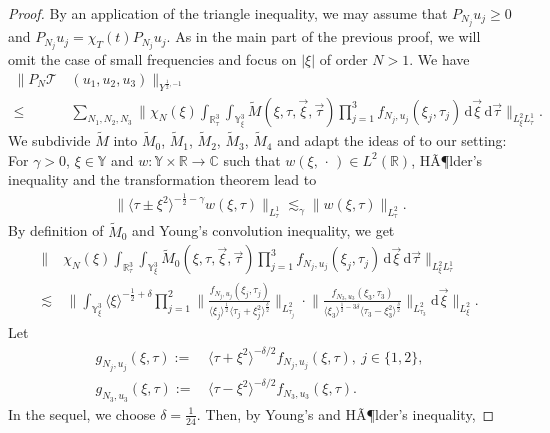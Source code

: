 \documentclass[reqno]{amsart}
\theoremstyle{Definitionl}
\theoremstyle{Definitionk}
\theoremstyle{definition}
\theoremstyle{Satzk}
\theoremstyle{Satzl}
\theoremstyle{Bemerkung}
\begin{document}
\begin{proof}By an application of the triangle inequality, we may assume that $P_{N_j}u_j\ge0$ and $P_{N_j}u_j=\chi_T(t)P_{N_j}u_j$. As in the main part of the previous proof, we will omit the case of small frequencies and focus on $|\xi|$ of order $N>1$. We have
\begin{align}
\|P_{N}\mathcal T&\,(u_1,u_2,u_3)\|_{Y^{\frac12,-1}}\nonumber\\
\le&\, \sum_{N_1,N_2,N_3}\Big\|\chi_N(\xi)\int_{\mathbb R^3_\tau}\int_{\mathbb Y^3_\xi}\tilde M(\xi,\tau,\vec\xi,\vec\tau)\prod_{j=1}^3f_{N_j,u_j}(\xi_j,\tau_j)\,\mathrm d\vec\xi\,\mathrm d\vec\tau\Big\|_{L^2_\xi L^1_\tau}.\label{L2L1}
\end{align}
We subdivide $\tilde M$ into $\tilde M_0$, $\tilde M_1$, $\tilde M_2$, $\tilde M_3$, $\tilde M_4$ and adapt the ideas of \cite[Thm. 4.2]{Herr} to our setting: For $\gamma>0$, $\xi\in\mathbb Y$ and $w\colon\mathbb Y\times\mathbb R\to\mathbb C$ such that $w(\xi,\,\cdot\,)\in L^2(\mathbb R)$, HÃ¶lder's inequality and the transformation theorem lead to
\begin{align}
\big\|\langle\tau\pm\xi^2\rangle^{-\frac12-\gamma}w(\xi,\tau)\big\|_{L^1_\tau}\lesssim_{\gamma}\big\|w(\xi,\tau)\big\|_{L^2_{\tau}}\label{CSU}.
\end{align}
By definition of $\tilde M_0$ and Young's convolution inequality, we get
\begin{align}
\bigg\|&\chi_N(\xi)\int_{\mathbb R^3_\tau}\int_{\mathbb Y^3_\xi}\tilde M_0(\xi,\tau,\vec\xi,\vec\tau)\prod_{j=1}^3f_{N_j,u_j}(\xi_j,\tau_j)\,\mathrm d\vec\xi\,\mathrm d\vec\tau\bigg\|_{L^2_\xi L^1_\tau}\nonumber\\
\lesssim&\, \bigg\|\int_{\mathbb Y^3_\xi}\langle\xi\rangle^{-\frac12+\delta}\prod_{j=1}^2\Big\|\frac{f_{N_j,u_j}(\xi_j,\tau_j)}{\langle\xi_j\rangle^{\frac12}\langle\tau_j+\xi_j^2\rangle^{\frac\delta2}}\Big\|_{L^2_{\tau_j}}\cdot\Big\|\frac{f_{N_3,u_3}(\xi_3,\tau_3)}{\langle\xi_3\rangle^{\frac12-3\delta}\langle\tau_3-\xi_3^2\rangle^{\frac\delta2}}\Big\|_{L^2_{\tau_3}}\mathrm d\vec\xi\bigg\|_{L^2_\xi}.\label{os}
\end{align}
Let 
\begin{align*}
g_{N_j,u_j}(\xi,\tau):=&\, \langle\tau+\xi^2\rangle^{-\delta/2}f_{N_j,u_j}(\xi,\tau),\ j\in\{1,2\},\\
g_{N_3,u_3}(\xi,\tau):=&\, \langle\tau-\xi^2\rangle^{-\delta/2}f_{N_3,u_3}(\xi,\tau).
\end{align*} 
In the sequel, we choose $\delta=\tfrac{1}{24}$. Then, by Young's and HÃ¶lder's inequality,

\end{proof}
\end{document}
